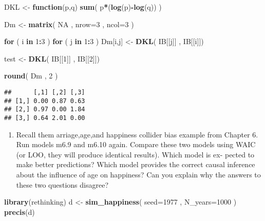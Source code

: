 \documentclass[
]{article}
\newenvironment{Shaded}{\begin{snugshade}}{\end{snugshade}}
\newcommand{\ControlFlowTok}[1]{\textcolor[rgb]{0.13,0.29,0.53}{\textbf{#1}}}
\newcommand{\DataTypeTok}[1]{\textcolor[rgb]{0.13,0.29,0.53}{#1}}
\newcommand{\DecValTok}[1]{\textcolor[rgb]{0.00,0.00,0.81}{#1}}
\newcommand{\KeywordTok}[1]{\textcolor[rgb]{0.13,0.29,0.53}{\textbf{#1}}}
\newcommand{\NormalTok}[1]{#1}
\newcommand{\OperatorTok}[1]{\textcolor[rgb]{0.81,0.36,0.00}{\textbf{#1}}}
\newcommand{\OtherTok}[1]{\textcolor[rgb]{0.56,0.35,0.01}{#1}}
\newcommand{\StringTok}[1]{\textcolor[rgb]{0.31,0.60,0.02}{#1}}
\providecommand{\tightlist}{%
  \setlength{\itemsep}{0pt}\setlength{\parskip}{0pt}}
\begin{document}
\begin{Shaded}
\begin{Highlighting}[]
\NormalTok{DKL <-}\StringTok{ }\ControlFlowTok{function}\NormalTok{(p,q) }\KeywordTok{sum}\NormalTok{( p}\OperatorTok{*}\NormalTok{(}\KeywordTok{log}\NormalTok{(p)}\OperatorTok{-}\KeywordTok{log}\NormalTok{(q)) )}



\NormalTok{Dm <-}\StringTok{ }\KeywordTok{matrix}\NormalTok{( }\OtherTok{NA}\NormalTok{ , }\DataTypeTok{nrow=}\DecValTok{3}\NormalTok{ , }\DataTypeTok{ncol=}\DecValTok{3}\NormalTok{ )}

\ControlFlowTok{for}\NormalTok{ ( i }\ControlFlowTok{in} \DecValTok{1}\OperatorTok{:}\DecValTok{3}\NormalTok{ ) }\ControlFlowTok{for}\NormalTok{ ( j }\ControlFlowTok{in} \DecValTok{1}\OperatorTok{:}\DecValTok{3}\NormalTok{ ) Dm[i,j] <-}\StringTok{ }\KeywordTok{DKL}\NormalTok{( IB[[j]] , IB[[i]])}

\NormalTok{test <-}\StringTok{ }\KeywordTok{DKL}\NormalTok{( IB[[}\DecValTok{1}\NormalTok{]] , IB[[}\DecValTok{2}\NormalTok{]])}
  
\KeywordTok{round}\NormalTok{( Dm , }\DecValTok{2}\NormalTok{ )}
\end{Highlighting}
\end{Shaded}

\begin{verbatim}
##      [,1] [,2] [,3]
## [1,] 0.00 0.87 0.63
## [2,] 0.97 0.00 1.84
## [3,] 0.64 2.01 0.00
\end{verbatim}

\begin{enumerate}
\def\labelenumi{\arabic{enumi}.}
\setcounter{enumi}{1}
\tightlist
\item
  Recall them arriage,age,and happiness collider bias example from
  Chapter 6. Run models m6.9 and m6.10 again. Compare these two models
  using WAIC (or LOO, they will produce identical results). Which model
  is ex- pected to make better predictions? Which model provides the
  correct causal inference about the influence of age on happiness? Can
  you explain why the answers to these two questions disagree?
\end{enumerate}

\begin{Shaded}
\begin{Highlighting}[]
\KeywordTok{library}\NormalTok{(rethinking)}
\NormalTok{d <-}\StringTok{ }\KeywordTok{sim_happiness}\NormalTok{( }\DataTypeTok{seed=}\DecValTok{1977}\NormalTok{ , }\DataTypeTok{N_years=}\DecValTok{1000}\NormalTok{ )}
\KeywordTok{precis}\NormalTok{(d)}
\end{Highlighting}
\end{Shaded}
\end{document}
